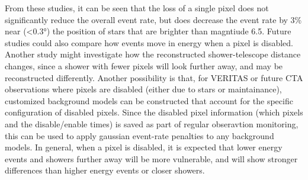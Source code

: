     From these studies, it can be seen that the loss of a single pixel does not significantly reduce the overall event rate, but does decrease the event rate by \nicetilde{}3\% near (<\ang{0.3}) the position of stars that are brighter than magntiude 6.5.
    Future studies could also compare how events move in energy when a pixel is disabled.
    Another study might investigate how the reconstructed shower-telescope distance changes, since a shower with fewer pixels will look further away, and may be reconstructed differently.
    Another possibility is that, for VERITAS or future CTA observations where pixels are disabled (either due to stars or maintainance), customized background models can be constructed that account for the specific configuration of disabled pixels.
    Since the disabled pixel information (which pixels and the disable/enable times) is saved as part of regular obseravtion monitoring, this can be used to apply gaussian event-rate penalties to any background models.
    In general, when a pixel is disabled, it is expected that lower energy events and showers further away will be more vulnerable, and will show stronger differences than higher energy events or closer showers.


